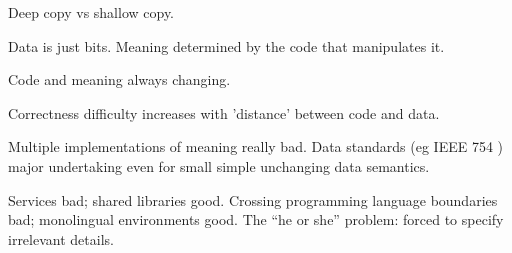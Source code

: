 Deep copy vs shallow copy.

Data is just bits. 
Meaning determined by the code that manipulates it. 

Code and meaning always changing.

Correctness difficulty increases
with 'distance' between code and data. 

Multiple implementations of meaning really bad.
Data standards (eg IEEE 754 \cite{Higham2002ASNA, IEEE:1985:AIS,
P754:2008:ISF, Muller_et_al_2010_handbook_fp}) major undertaking even for
small simple unchanging data semantics.

Services bad; shared libraries good.
Crossing programming language boundaries bad; 
monolingual environments \cite{Heering:1985:TMP:3318.3321} good.
The ``he or she'' problem: forced to specify irrelevant details.
